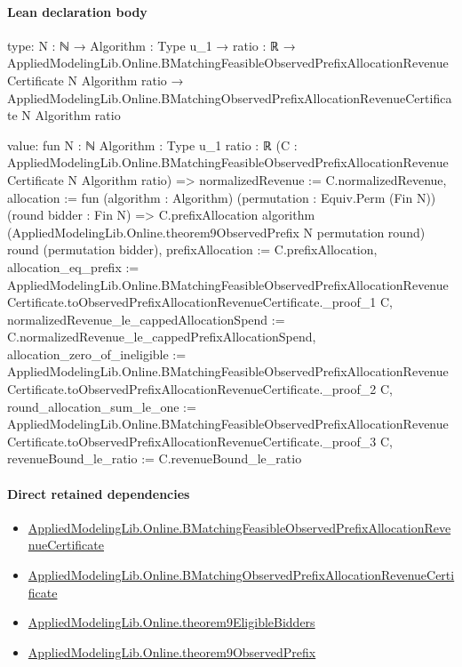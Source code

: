 \documentclass[10pt]{article}
\begin{document}
\paragraph{Lean declaration body}
\begin{ReviewVerbatim}
type:
{N : ℕ} →
  {Algorithm : Type u_1} →
    {ratio : ℝ} →
      AppliedModelingLib.Online.BMatchingFeasibleObservedPrefixAllocationRevenueCertificate N Algorithm ratio →
        AppliedModelingLib.Online.BMatchingObservedPrefixAllocationRevenueCertificate N Algorithm ratio

value:
fun {N : ℕ} {Algorithm : Type u_1} {ratio : ℝ}
    (C : AppliedModelingLib.Online.BMatchingFeasibleObservedPrefixAllocationRevenueCertificate N Algorithm ratio) =>
  { normalizedRevenue := C.normalizedRevenue,
    allocation := fun (algorithm : Algorithm) (permutation : Equiv.Perm (Fin N)) (round bidder : Fin N) =>
      C.prefixAllocation algorithm (AppliedModelingLib.Online.theorem9ObservedPrefix N permutation round) round
        (permutation bidder),
    prefixAllocation := C.prefixAllocation,
    allocation_eq_prefix :=
      AppliedModelingLib.Online.BMatchingFeasibleObservedPrefixAllocationRevenueCertificate.toObservedPrefixAllocationRevenueCertificate._proof_1
        C,
    normalizedRevenue_le_cappedAllocationSpend := C.normalizedRevenue_le_cappedPrefixAllocationSpend,
    allocation_zero_of_ineligible :=
      AppliedModelingLib.Online.BMatchingFeasibleObservedPrefixAllocationRevenueCertificate.toObservedPrefixAllocationRevenueCertificate._proof_2
        C,
    round_allocation_sum_le_one :=
      AppliedModelingLib.Online.BMatchingFeasibleObservedPrefixAllocationRevenueCertificate.toObservedPrefixAllocationRevenueCertificate._proof_3
        C,
    revenueBound_le_ratio := C.revenueBound_le_ratio }
\end{ReviewVerbatim}

\paragraph{Direct retained dependencies}
\begin{itemize}\raggedright
\item \hyperlink{governing-declaration-6c23f9a479a4bda0}{Applied\allowbreak{}Modeling\allowbreak{}Lib.\allowbreak{}Online.\allowbreak{}B\allowbreak{}Matching\allowbreak{}Feasible\allowbreak{}Observed\allowbreak{}Prefix\allowbreak{}Allocation\allowbreak{}Revenue\allowbreak{}Certificate}
\item \hyperlink{governing-declaration-cbc294fc6f83bc68}{Applied\allowbreak{}Modeling\allowbreak{}Lib.\allowbreak{}Online.\allowbreak{}B\allowbreak{}Matching\allowbreak{}Observed\allowbreak{}Prefix\allowbreak{}Allocation\allowbreak{}Revenue\allowbreak{}Certificate}
\item \hyperlink{governing-declaration-cc46dec5c43a2669}{Applied\allowbreak{}Modeling\allowbreak{}Lib.\allowbreak{}Online.\allowbreak{}theorem9\allowbreak{}Eligible\allowbreak{}Bidders}
\item \hyperlink{governing-declaration-d167f7979bcb01dc}{Applied\allowbreak{}Modeling\allowbreak{}Lib.\allowbreak{}Online.\allowbreak{}theorem9\allowbreak{}Observed\allowbreak{}Prefix}
\end{itemize}
\hypertarget{governing-declaration-6c57a9ba136af21f}{}
\end{document}
